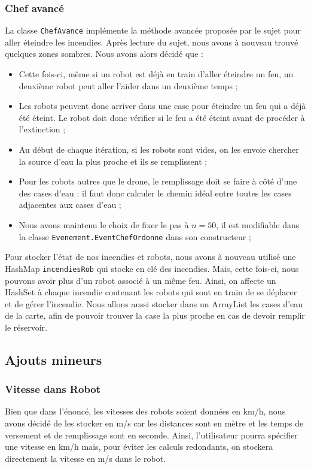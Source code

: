\documentclass[a4paper,8pt]{article} %
\begin{document}
\subsubsection{Chef avancé}
La classe \texttt{ChefAvance} implémente la méthode avancée proposée par le sujet pour aller éteindre les incendies. Après lecture du sujet, nous avons à nouveau trouvé quelques zones sombres. Nous avons alors décidé que :
\begin{itemize}
    \item Cette fois-ci, même si un robot est déjà en train d'aller éteindre un feu, un deuxième robot peut aller l'aider dans un deuxième temps ;
    \item Les robots peuvent donc arriver dans une case pour éteindre un feu qui a déjà été éteint. Le robot doit donc vérifier si le feu a été éteint avant de procéder à l'extinction ;
    \item Au début de chaque itération, si les robots sont vides, on les envoie chercher la source d'eau la plus proche et ils se remplissent ;
    \item Pour les robots autres que le drone, le remplissage doit se faire à côté d'une des cases d'eau : il faut donc calculer le chemin idéal entre toutes les cases adjacentes aux cases d'eau ;
    \item Nous avons maintenu le choix de fixer le pas à $n=50$, il est modifiable dans la classe \texttt{Evenement.EventChefOrdonne} 
    dans son constructeur ;
\end{itemize}

Pour stocker l'état de nos incendies et robots, nous avons à nouveau utilisé une HashMap \texttt{incendiesRob} qui stocke en clé des incendies. Mais, cette fois-ci, nous pouvons avoir plus d'un robot associé à un même feu. Ainsi, on affecte un HashSet à chaque incendie contenant les robots qui sont en train de se déplacer et de gérer l'incendie.
Nous allons aussi stocker dans un ArrayList les cases d'eau de la carte, afin de pouvoir trouver la case la plus proche en cas de devoir remplir le réservoir.

\subsection{Ajouts mineurs}
\subsubsection{Vitesse dans Robot}
Bien que dans l'énoncé, les vitesses des robots soient données en km/h, nous avons décidé de les stocker en m/s
car les distances sont en mètre et les temps de versement et de remplissage sont en seconde. Ainsi, l'utilisateur pourra spécifier une 
vitesse en km/h mais, pour éviter les calculs redondants, on stockera directement la vitesse en m/s dans le robot.
\end{document}
